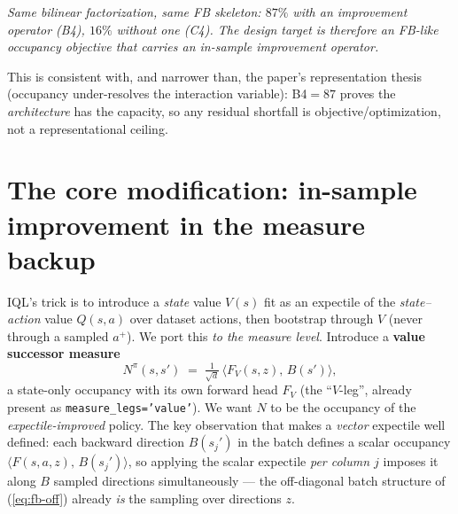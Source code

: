\documentclass[11pt]{article}
\newcommand{\inner}[2]{\langle #1,\, #2\rangle}
\newcommand{\Fmap}{F}                                %
\newcommand{\Bmap}{B}                                %
\begin{document}
\begin{center}\itshape
Same bilinear factorization, same FB skeleton: $87\%$ with an improvement
operator (B4), $16\%$ without one (C4). The design target is therefore an
FB-like \emph{occupancy} objective that carries an in-sample improvement
operator.
\end{center}

This is consistent with, and narrower than, the paper's representation thesis
(occupancy under-resolves the interaction variable): B4$=87$ proves the
\emph{architecture} has the capacity, so any residual shortfall is
objective/optimization, not a representational ceiling.

\section{The core modification: in-sample improvement in the measure backup}

IQL's trick is to introduce a \emph{state} value $V(s)$ fit as an expectile of
the \emph{state--action} value $Q(s,a)$ over dataset actions, then bootstrap
through $V$ (never through a sampled $a^{+}$). We port this \emph{to the measure
level}. Introduce a \textbf{value successor measure}
\begin{equation}
  N^{\pi}(s,s') \;=\; \tfrac{1}{\sqrt d}\,\inner{\Fmap_V(s,z)}{\Bmap(s')},
  \label{eq:value-measure}
\end{equation}
a state-only occupancy with its own forward head $\Fmap_V$ (the ``$V$-leg'',
already present as \texttt{measure\_legs='value'}). We want $N$ to be the
occupancy of the \emph{expectile-improved} policy. The key observation that
makes a \emph{vector} expectile well defined: each backward direction
$\Bmap(s_j')$ in the batch defines a scalar occupancy
$\inner{\Fmap(s,a,z)}{\Bmap(s_j')}$, so applying the scalar expectile
\emph{per column $j$} imposes it along $B$ sampled directions
simultaneously --- the off-diagonal batch structure of
(\ref{eq:fb-off}) already \emph{is} the sampling over directions $z$.
\end{document}
